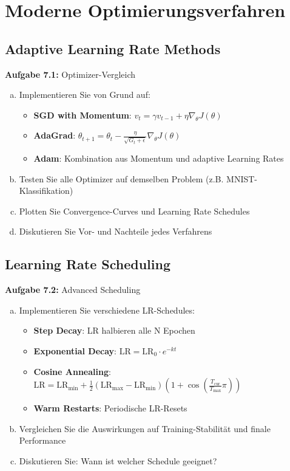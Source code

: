 \documentclass[12pt,a4paper]{article}
\begin{document}
\section{Moderne Optimierungsverfahren}

\subsection{Adaptive Learning Rate Methods}

\textbf{Aufgabe 7.1:} Optimizer-Vergleich

\begin{enumerate}[(a)]
    \item Implementieren Sie von Grund auf:
    \begin{itemize}
        \item \textbf{SGD with Momentum}: $v_t = \gamma v_{t-1} + \eta \nabla_\theta J(\theta)$
        \item \textbf{AdaGrad}: $\theta_{t+1} = \theta_t - \frac{\eta}{\sqrt{G_t + \epsilon}} \nabla_\theta J(\theta)$
        \item \textbf{Adam}: Kombination aus Momentum und adaptive Learning Rates
    \end{itemize}
    \item Testen Sie alle Optimizer auf demselben Problem (z.B. MNIST-Klassifikation)
    \item Plotten Sie Convergence-Curves und Learning Rate Schedules
    \item Diskutieren Sie Vor- und Nachteile jedes Verfahrens
\end{enumerate}

\subsection{Learning Rate Scheduling}

\textbf{Aufgabe 7.2:} Advanced Scheduling

\begin{enumerate}[(a)]
    \item Implementieren Sie verschiedene LR-Schedules:
    \begin{itemize}
        \item \textbf{Step Decay}: LR halbieren alle N Epochen
        \item \textbf{Exponential Decay}: $\text{LR} = \text{LR}_0 \cdot e^{-kt}$
        \item \textbf{Cosine Annealing}: $\text{LR} = \text{LR}_{\min} + \frac{1}{2}(\text{LR}_{\max} - \text{LR}_{\min})(1 + \cos(\frac{T_{\text{cur}}}{T_{\max}} \pi))$
        \item \textbf{Warm Restarts}: Periodische LR-Resets
    \end{itemize}
    \item Vergleichen Sie die Auswirkungen auf Training-Stabilität und finale Performance
    \item Diskutieren Sie: Wann ist welcher Schedule geeignet?
\end{enumerate}
\end{document}
